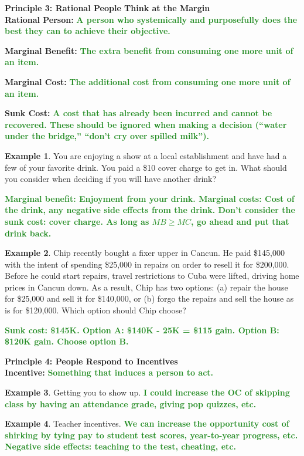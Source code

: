 \documentclass[11pt]{article}\usepackage[]{graphicx}\usepackage[]{color}
\theoremstyle{definition}
\newtheorem{exmp}{Example}[section]
\newcommand{\blank}[1]{}
\newcommand{\ddp}[1]{{\textbf{\textcolor{ForestGreen}{#1}}}}
\newcommand{\defn}[1]{\textbf{#1}}
\begin{document}
	\textbf{Principle 3: Rational People Think at the Margin}
	\\
	
	\defn{Rational Person:} \ddp{A person who systemically and purposefully does the best they can to achieve their objective. \\}
	
	\defn{Marginal Benefit:} \ddp{The extra benefit from consuming one more unit of an item.\\}
	
	\defn{Marginal Cost:} \ddp{The additional cost from consuming one more unit of an item.\\}
	
	\defn{Sunk Cost:} \ddp{A cost that has already been incurred and cannot be recovered. These should be ignored when making a decision (``water under the bridge,'' ``don't cry over spilled milk'').}
	
	\begin{exmp}
		You are enjoying a show at a local establishment and have had a few of your favorite drink. You paid a \$10 cover charge to get in. What should you consider when deciding if you will have another drink?
		\blank{} 
	\end{exmp}

	\ddp{Marginal benefit: Enjoyment from your drink. Marginal costs: Cost of the drink, any negative side effects from the drink. Don't consider the sunk cost: cover charge. As long as $MB \ge MC$, go ahead and put that drink back.}

	\begin{exmp} 
		Chip recently bought a fixer upper in Cancun. He paid \$145,000 with the intent of spending \$25,000 in repairs on order to resell it for \$200,000. Before he could start repairs, travel restrictions to Cuba were lifted, driving home prices in Cancun down. As a result, Chip has two options: (a) repair the house for \$25,000 and sell it for \$140,000, or (b) forgo the repairs and sell the house as is for \$120,000. Which option should Chip choose?
		\blank{}
	\end{exmp}
	\ddp{Sunk cost: \$145K. Option A: \$140K - 25K = \$115 gain. Option B: \$120K gain. Choose option B.\\}
	
	\textbf{Principle 4: People Respond to Incentives}
	\\
	
	\defn{Incentive:} \ddp{Something that induces a person to act.}
	
	
	\begin{exmp}
		Getting you to show up. \ddp{I could increase the OC of skipping class by having an attendance grade, giving pop quizzes, etc.}
	\end{exmp} 
	\blank{}
	\begin{exmp}
		Teacher incentives. \ddp{We can increase the opportunity cost of shirking by tying pay to student test scores, year-to-year progress, etc. Negative side effects: teaching to the test, cheating, etc.}
	\end{exmp} 
	\blank{}
\end{document}
